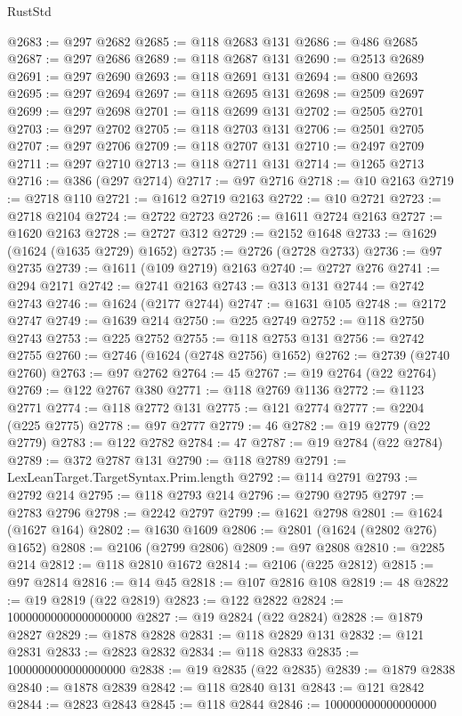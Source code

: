 \begin{lexlean}{RustStd}
\begin{coremodule}
@2683 := @297 @2682
@2685 := @118 @2683 @131
@2686 := @486 @2685
@2687 := @297 @2686
@2689 := @118 @2687 @131
@2690 := @2513 @2689
@2691 := @297 @2690
@2693 := @118 @2691 @131
@2694 := @800 @2693
@2695 := @297 @2694
@2697 := @118 @2695 @131
@2698 := @2509 @2697
@2699 := @297 @2698
@2701 := @118 @2699 @131
@2702 := @2505 @2701
@2703 := @297 @2702
@2705 := @118 @2703 @131
@2706 := @2501 @2705
@2707 := @297 @2706
@2709 := @118 @2707 @131
@2710 := @2497 @2709
@2711 := @297 @2710
@2713 := @118 @2711 @131
@2714 := @1265 @2713
@2716 := @386 (@297 @2714)
@2717 := @97 @2716
@2718 := @10 @2163
@2719 := @2718 @110
@2721 := @1612 @2719 @2163
@2722 := @10 @2721
@2723 := @2718 @2104
@2724 := @2722 @2723
@2726 := @1611 @2724 @2163
@2727 := @1620 @2163
@2728 := @2727 @312
@2729 := @2152 @1648
@2733 := @1629 (@1624 (@1635 @2729) @1652)
@2735 := @2726 (@2728 @2733)
@2736 := @97 @2735
@2739 := @1611 (@109 @2719) @2163
@2740 := @2727 @276
@2741 := @294 @2171
@2742 := @2741 @2163
@2743 := @313 @131
@2744 := @2742 @2743
@2746 := @1624 (@2177 @2744)
@2747 := @1631 @105
@2748 := @2172 @2747
@2749 := @1639 @214
@2750 := @225 @2749
@2752 := @118 @2750 @2743
@2753 := @225 @2752
@2755 := @118 @2753 @131
@2756 := @2742 @2755
@2760 := @2746 (@1624 (@2748 @2756) @1652)
@2762 := @2739 (@2740 @2760)
@2763 := @97 @2762
@2764 := 45
@2767 := @19 @2764 (@22 @2764)
@2769 := @122 @2767 @380
@2771 := @118 @2769 @1136
@2772 := @1123 @2771
@2774 := @118 @2772 @131
@2775 := @121 @2774
@2777 := @2204 (@225 @2775)
@2778 := @97 @2777
@2779 := 46
@2782 := @19 @2779 (@22 @2779)
@2783 := @122 @2782
@2784 := 47
@2787 := @19 @2784 (@22 @2784)
@2789 := @372 @2787 @131
@2790 := @118 @2789
@2791 := LexLeanTarget.TargetSyntax.Prim.length
@2792 := @114 @2791
@2793 := @2792 @214
@2795 := @118 @2793 @214
@2796 := @2790 @2795
@2797 := @2783 @2796
@2798 := @2242 @2797
@2799 := @1621 @2798
@2801 := @1624 (@1627 @164)
@2802 := @1630 @1609
@2806 := @2801 (@1624 (@2802 @276) @1652)
@2808 := @2106 (@2799 @2806)
@2809 := @97 @2808
@2810 := @2285 @214
@2812 := @118 @2810 @1672
@2814 := @2106 (@225 @2812)
@2815 := @97 @2814
@2816 := @14 @45
@2818 := @107 @2816 @108
@2819 := 48
@2822 := @19 @2819 (@22 @2819)
@2823 := @122 @2822
@2824 := 10000000000000000000
@2827 := @19 @2824 (@22 @2824)
@2828 := @1879 @2827
@2829 := @1878 @2828
@2831 := @118 @2829 @131
@2832 := @121 @2831
@2833 := @2823 @2832
@2834 := @118 @2833
@2835 := 1000000000000000000
@2838 := @19 @2835 (@22 @2835)
@2839 := @1879 @2838
@2840 := @1878 @2839
@2842 := @118 @2840 @131
@2843 := @121 @2842
@2844 := @2823 @2843
@2845 := @118 @2844
@2846 := 100000000000000000

\end{coremodule}
\end{lexlean}
